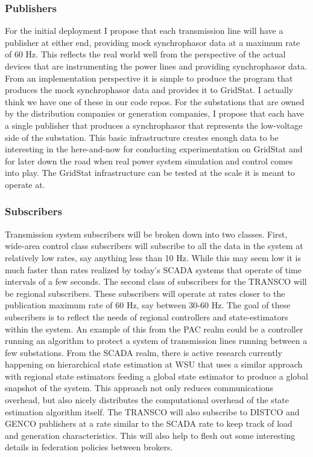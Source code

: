 \documentclass{article}
\begin{document}
\subsubsection {Publishers}
For the initial deployment I propose that each transmission line will have a publisher 
at either end, providing mock synchrophasor data at a maximum rate of 60 Hz.  This 
reflects the real world well from the perspective of the actual devices that are 
instrumenting the power lines and providing synchrophasor data.  From an implementation 
perspective it is simple to produce the program that produces the mock synchrophasor 
data and provides it to GridStat. I actually think we have one of these in our code 
repos.  For the substations that are owned by the distribution companies or generation 
companies, I propose that each have a single publisher that produces a synchrophasor 
that represents the low-voltage side of the substation.  This basic infrastructure 
creates enough data to be interesting in the here-and-now for conducting experimentation
 on GridStat and for later down the road when real power system simulation and control
 comes into play.  The GridStat infrastructure can be tested at the scale it is meant 
to operate at.


\subsubsection {Subscribers}
Transmission system subscribers will be broken down into two classes.  First, wide-area
 control class subscribers will subscribe to all the data in the system at relatively
 low rates, say anything less than 10 Hz.  While this may seem low it is much faster 
than rates realized by today's SCADA systems that operate of time intervals of a few 
seconds.  The second class of subscribers for the TRANSCO will be regional subscribers.
  These subscribers will operate at rates closer to the publication maximum rate of 
60 Hz, say between 30-60 Hz.  The goal of these subscribers is to reflect the needs of
 regional controllers and state-estimators within the system.  An example of this from 
the PAC realm could be a controller running an algorithm to protect a system of 
transmission lines running between a few substations.  From the SCADA realm, there is 
active research currently happening on hierarchical state estimation at WSU that uses 
a similar approach with regional state estimators feeding a global state estimator to
 produce a global snapshot of the system.  This approach not only reduces 
communications overhead, but also nicely distributes the computational overhead of the
 state estimation algorithm itself.   The TRANSCO will also subscribe to DISTCO and 
GENCO publishers at a rate similar to the SCADA rate to keep track of load and 
generation characteristics.  This will also help to flesh out some interesting 
details in federation policies between brokers.\\
\end{document}
